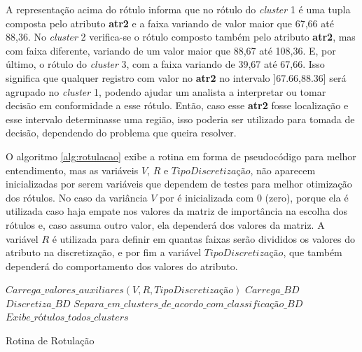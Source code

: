 A representação acima do rótulo informa que no rótulo do \textit{cluster} 1 é uma tupla composta pelo atributo \textbf{atr2} e a faixa variando de valor maior que 67,66 até 88,36. No \textit{cluster} 2 verifica-se o rótulo composto também pelo atributo \textbf{atr2}, mas com faixa diferente, variando de um valor maior que 88,67 até 108,36. E, por último, o rótulo do \textit{cluster} 3, com a faixa variando de 39,67 até 67,66. Isso significa que qualquer registro com valor no \textbf{atr2} no intervalo ]67.66,88.36] será agrupado no \textit{cluster} 1, podendo ajudar um analista a interpretar ou tomar decisão em conformidade a esse rótulo. Então, caso esse \textbf{atr2} fosse localização e esse intervalo determinasse uma região, isso poderia ser utilizado para tomada de decisão, dependendo do problema que queira resolver. 

O algoritmo \ref{alg:rotulacao} exibe a rotina em forma de pseudocódigo para melhor entendimento, mas as variáveis ${V}$, ${R}$ e ${TipoDiscretização}$, não aparecem inicializadas por serem variáveis que dependem de testes para melhor otimização dos rótulos. No caso da variância ${V}$ por é inicializada com 0 (zero), porque ela é utilizada caso haja empate nos valores da matriz de importância na escolha dos rótulos e, caso assuma outro valor, ela dependerá dos valores da matriz. A variável ${R}$ é utilizada para definir em quantas faixas serão divididos os valores do atributo na discretização, e por fim a variável ${TipoDiscretização}$, que também dependerá do comportamento dos valores do atributo. 

\IncMargin{1em}
\begin{algorithm}[h]

\nl $Carrega\_valores\_auxiliares(V,R,TipoDiscretização)$\;
\nl $Carrega\_BD$\; 
\nl $Discretiza\_BD$\; 
\nl $Separa\_em\_clusters\_de\_acordo\_com\_classificação\_BD$\; 
\nl {}
 \nl $Exibe\_rótulos\_todos\_clusters$\; 
 \caption{Rotina de Rotulação}\label{alg:rotulacao}
 
\end{algorithm}
\DecMargin{1em}
        
